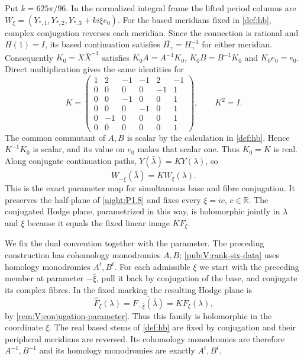 
\begin{remark}
\hypertarget{tag-PV05}{}\label{rem:V:conjugation-parameter}
Put $k=625\pi/96$. In the normalized integral frame the lifted
period columns are
$W_\xi=(Y_{*,1},Y_{*,2},Y_{*,3}+ki\xi e_0)$.
For the based meridians fixed in \cref{def:hb}, complex conjugation
reverses each meridian. Since the connection is rational and
$H(1)=I$, its based continuation satisfies
$\overline{H_\gamma}=H_\gamma^{-1}$ for either meridian.
Consequently $K_0=X\bar X^{-1}$ satisfies
$K_0A=A^{-1}K_0$, $K_0B=B^{-1}K_0$ and $K_0e_0=e_0$.
Direct multiplication gives the same identities for
\[
 K=\begin{pmatrix}
 1&2&-1&-1&2&-1\\
 0&0&0&0&-1&1\\
 0&0&-1&0&0&1\\
 0&0&0&-1&0&1\\
 0&-1&0&0&0&1\\
 0&0&0&0&0&1
 \end{pmatrix},\qquad K^2=I.
\]
The common commutant of $A,B$ is scalar by the calculation in
\cref{def:hb}. Hence $K^{-1}K_0$ is scalar, and its value on
$e_0$ makes that scalar one. Thus $K_0=K$ is real.
Along conjugate continuation paths,
$Y(\bar\lambda)=K\overline{Y(\lambda)}$, so
\[
 \overline{W_{-\bar\xi}(\bar\lambda)}=K W_\xi(\lambda).
\]
This is the exact parameter map for simultaneous base and fibre
conjugation. It preserves the half-plane of \cref{night:P1.8}
and fixes every $\xi=ic$, $c\in\mathbb R$. The conjugated
Hodge plane, parametrized in this way, is holomorphic jointly
in $\lambda$ and $\xi$ because it equals the fixed linear
image $K F_\xi$.
\end{remark}

\item We fix the dual convention together with the parameter.
The preceding construction has cohomology monodromies $A,B$;
\cref{pub:V:rank-six-data} uses homology monodromies $A^t,B^t$.
For each admissible $\xi$ we start with the preceding member
at parameter $-\bar\xi$, pull it back by conjugation of the
base, and conjugate its complex fibres. In the fixed marking
the resulting Hodge plane is
\[
 \widehat F_\xi(\lambda)
 =\overline{F_{-\bar\xi}(\bar\lambda)}
 =K F_\xi(\lambda),
\]
by \cref{rem:V:conjugation-parameter}. Thus this family is
holomorphic in the coordinate $\xi$. The real based stems
of \cref{def:hb} are fixed by conjugation and their peripheral
meridians are reversed. Its cohomology monodromies are therefore
$A^{-1},B^{-1}$ and its homology monodromies are exactly
$A^t,B^t$.


